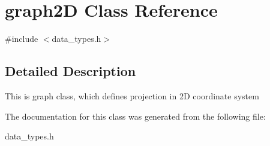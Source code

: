 \hypertarget{classgraph2_d}{}\section{graph2D Class Reference}
\label{classgraph2_d}


{\ttfamily \#include $<$data\+\_\+types.\+h$>$}



\subsection{Detailed Description}
This is graph class, which defines projection in 2D coordinate system 

The documentation for this class was generated from the following file\+:\begin{DoxyCompactItemize}
\item 
data\+\_\+types.\+h\end{DoxyCompactItemize}
